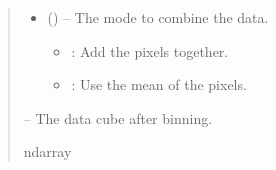 \documentclass[letterpaper,11pt,english]{sphinxmanual}
\begin{document}
\begin{savenotes}
\begin{fulllineitems}
\begin{quote}
\begin{description}
\begin{itemize}
\item {} 
\sphinxAtStartPar
{} (\sphinxstyleliteralemphasis{\sphinxupquote{, }}) – 
\sphinxAtStartPar
The mode to combine the data.
\begin{itemize}
\item {} 
\sphinxAtStartPar
{} : Add the pixels together.

\item {} 
\sphinxAtStartPar
{} : Use the mean of the pixels.

\end{itemize}


\end{itemize}

\sphinxAtStartPar
{} – The data cube after binning.

\sphinxAtStartPar
ndarray

\end{description}\end{quote}

\end{fulllineitems}\end{savenotes}

\end{document}
